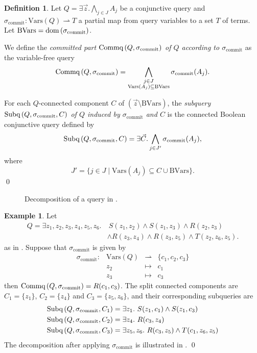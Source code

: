 \documentclass[12pt]{report}
\theoremstyle{plain}
\theoremstyle{definition}
\newtheorem{definition}[theorem]{Definition}
\newtheorem{example}[theorem]{Example}
\def\Vars{{\mathrm{Vars}}}
\newcommand{\dom}[1]{\ensuremath{\normalfont{\operatorname{dom}} \left( #1 \right)}}
\newcommand{\Subq}[3]{\ensuremath{\normalfont{\textrm{Subq}} \left( #1, #2, #3 \right)}}
\newcommand{\Commq}[2]{\ensuremath{\normalfont{\textrm{Commq}} \left( #1, #2 \right)}}
\begin{document}
\begin{definition}
  Let $Q = \exists \vec{z}. \bigwedge_{j \in J} A_j$ be a conjunctive query and $\sigma_\mathrm{commit}: \Vars(Q) \rightharpoonup T$ a partial map from query variables to a set $T$ of terms. Let $\mathrm{BVars} = \dom{\sigma_\mathrm{commit}}$.

  We define the \emph{committed part $\Commq{Q}{\sigma_\mathrm{commit}}$ of $Q$ according to $\sigma_\mathrm{commit}$} as the variable-free query
  $$\Commq{Q}{\sigma_\mathrm{commit}} = \bigwedge_{\substack{j \in J \\ \Vars(A_j) \subseteq \mathrm{BVars}}} \sigma_\mathrm{commit}(A_j).$$

  For each $Q$-connected component $C$ of $(\vec{z} \setminus \mathrm{BVars})$, the \emph{subquery $\Subq{Q}{\sigma_\mathrm{commit}}{C}$ of $Q$ induced by $\sigma_\mathrm{commit}$ and $C$} is the connected Boolean conjunctive query defined by
  $$\Subq{Q}{\sigma_\mathrm{commit}}{C} = \exists \vec{C}. \bigwedge_{j \in J'} \sigma_\mathrm{commit}(A_j),$$
  where $$J' = \{ j \in J \mid \Vars(A_j) \subseteq C \cup \mathrm{BVars} \}.$$
  \qed
\end{definition}

\begin{figure}[ht]
  \centering
  
  \caption{Decomposition of a query in .}
  \label{bcq-decomposition-example-figure}
\end{figure}

\begin{example}
\label{bcq-decomposition-example}
  Let
  \begin{align*}
    Q = \exists z_1,z_2,z_3,z_4,z_5,z_6.&\ S(z_1, z_2) \wedge S(z_1,z_3) \wedge R(z_2, z_3) \\
    &\wedge R(z_3, z_4) \wedge R(z_3, z_5) \wedge T(z_2, z_6, z_5).
  \end{align*}
  as in . Suppose that $\sigma_\mathrm{commit}$ is given by \[\begin{array}{cccc}
    \sigma_\mathrm{commit}: &\Vars(Q) &\rightharpoonup &\{c_1, c_2, c_3\} \\
    &z_2 &\mapsto &c_1 \\
    &z_3 &\mapsto &c_3
  \end{array}\]
  then $\Commq{Q}{\sigma_\mathrm{commit}} = R(c_1, c_3)$. The split connected components are $C_1 = \{z_1\}$, $C_2 = \{z_4\}$ and $C_3 = \{z_5, z_6\}$, and their corresponding subqueries are
  \begin{align*}
    \Subq{Q}{\sigma_\mathrm{commit}}{C_1} &= \exists z_1.\ S(z_1, c_1) \wedge S(z_1, c_3) \\
    \Subq{Q}{\sigma_\mathrm{commit}}{C_2} &= \exists z_4.\ R(c_3, z_4) \\
    \Subq{Q}{\sigma_\mathrm{commit}}{C_3} &= \exists z_5, z_6.\ R(c_3, z_5) \wedge T(c_1, z_6, z_5)
  \end{align*}
  The decomposition after applying $\sigma_\mathrm{commit}$ is illustrated in .
  \qed
\end{example}
\end{document}
